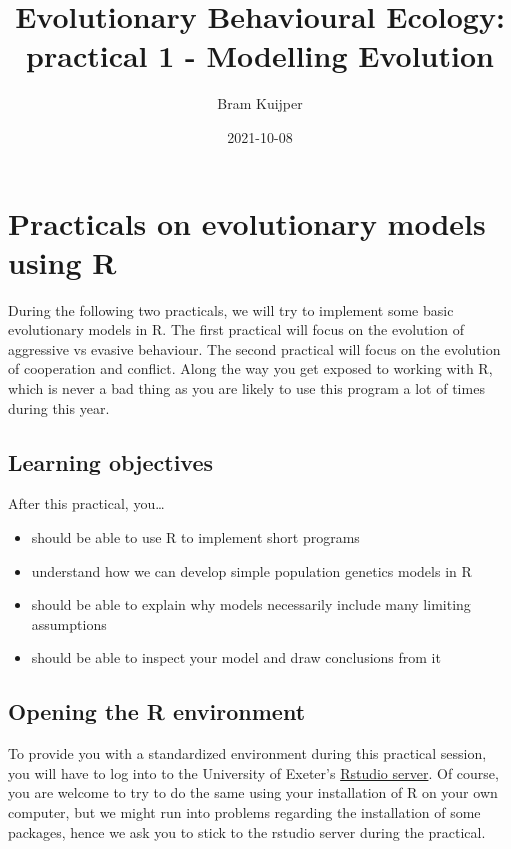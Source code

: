 \documentclass[
]{book}
\title{Evolutionary Behavioural Ecology: practical 1 - Modelling Evolution}
\author{Bram Kuijper}
\date{2021-10-08}
\providecommand{\tightlist}{%
  \setlength{\itemsep}{0pt}\setlength{\parskip}{0pt}}
\begin{document}
\maketitle

{
\setcounter{tocdepth}{1}
\tableofcontents
}
\hypertarget{practicals-on-evolutionary-models-using-r}{%
\chapter{Practicals on evolutionary models using R}\label{practicals-on-evolutionary-models-using-r}}

During the following two practicals, we will try to implement some basic evolutionary models in R. The first practical will focus on the evolution of aggressive vs evasive behaviour. The second practical will focus on the evolution of cooperation and conflict. Along the way you get exposed to working with R, which is never a bad thing as you are likely to use this program a lot of times during this year.

\hypertarget{learning-objectives}{%
\section{Learning objectives}\label{learning-objectives}}

After this practical, you\ldots{}

\begin{itemize}
\tightlist
\item
  should be able to use R to implement short programs
\item
  understand how we can develop simple population genetics models in R
\item
  should be able to explain why models necessarily include many limiting assumptions
\item
  should be able to inspect your model and draw conclusions from it
\end{itemize}

\hypertarget{opening-the-r-environment}{%
\section{Opening the R environment}\label{opening-the-r-environment}}

To provide you with a standardized environment during this practical session, you will have to log into to the University of Exeter's \href{https://rstudio01.cles.ex.ac.uk}{Rstudio server}. Of course, you are welcome to try to do the same using your installation of R on your own computer, but we might run into problems regarding the installation of some packages, hence we ask you to stick to the rstudio server during the practical.
\end{document}
